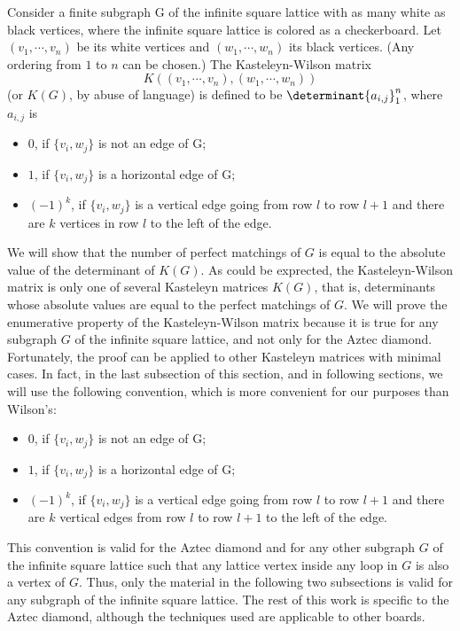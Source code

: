 \documentclass[10pt,reqno]{amsart}
\theoremstyle{plain}
\theoremstyle{definition}
\theoremstyle{remark}
\begin{document}
Consider a finite 
subgraph G of the infinite square lattice with as many white as
black vertices, where the infinite square lattice is colored as
a checkerboard. Let $(v_1,\dotsb ,v_n)$ be its white vertices and 
$(w_1,\dotsb ,w_n)$ its black vertices. (Any ordering from $1$ to $n$
can be chosen.) The
Kasteleyn-Wilson matrix \[K((v_1,\dotsb ,v_n),(w_1,\dotsb ,w_n))\] (or
$K(G)$, by abuse of language) is defined
to be $\determinant{a_{i,j}}_1^n$, where $a_{i,j}$ is
\begin{itemize}
\item $0$, if $\{v_i,w_j\}$ is not an edge of G;
\item $1$, if $\{v_i,w_j\}$ is a horizontal edge of G;
\item $(-1)^k$, if $\{v_i,w_j\}$ is a vertical edge going from row $l$ 
to row $l+1$ and there are $k$ vertices in row $l$ to the left of the edge.
\end{itemize}

We will show that the number of perfect matchings of $G$ is equal to
the absolute value of the determinant of $K(G)$. As could be exprected,
the Kasteleyn-Wilson matrix is only one of several Kasteleyn matrices $K(G)$,
that is, determinants whose absolute values are equal
to the perfect matchings of $G$. We will prove the enumerative property
of the Kasteleyn-Wilson matrix because it is true for any subgraph $G$
of the infinite square lattice, and not only for the Aztec diamond.
Fortunately, the proof can be applied to other Kasteleyn matrices with
minimal cases. In fact, in the last subsection of this section, and in 
following sections, we will use the following convention, which is more
convenient for our purposes than Wilson's:
\begin{itemize}
\item $0$, if $\{v_i,w_j\}$ is not an edge of G;
\item $1$, if $\{v_i,w_j\}$ is a horizontal edge of G;
\item $(-1)^k$, if $\{v_i,w_j\}$ is a vertical edge going from row $l$ 
to row $l+1$ and there are $k$ vertical edges from row $l$ to row $l+1$
to the left of the edge.
\end{itemize}
This convention is valid for the Aztec diamond and for any 
other subgraph $G$ of the infinite square lattice such that any
lattice vertex inside any loop in $G$ is also a vertex of $G$. Thus, only
the material in the following two subsections is valid for any subgraph
of the infinite square lattice. The rest of this work is specific to
the Aztec diamond, although the techniques used are applicable
to other boards.
\end{document}
